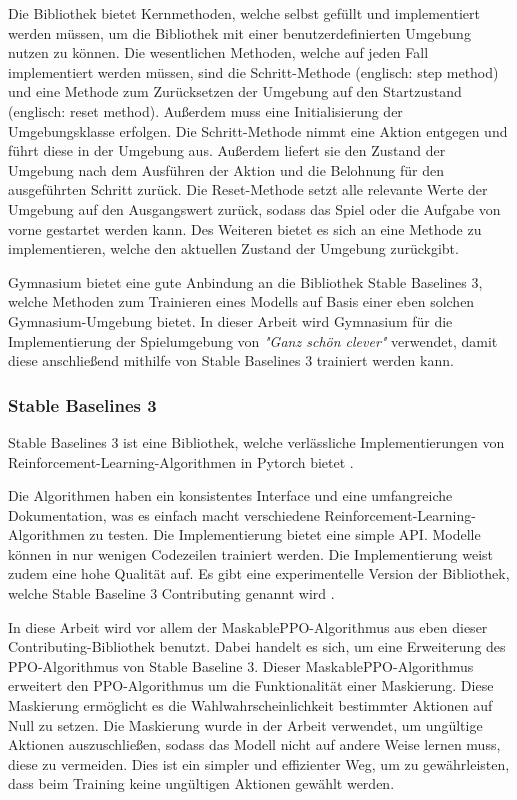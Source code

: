 Die Bibliothek bietet Kernmethoden, welche selbst gefüllt und implementiert werden müssen, um die Bibliothek mit einer benutzerdefinierten Umgebung nutzen zu können. Die wesentlichen Methoden, welche auf jeden Fall implementiert werden müssen, sind die Schritt-Methode (englisch: step method) und eine Methode zum Zurücksetzen der Umgebung auf den Startzustand (englisch: reset method). Außerdem muss eine Initialisierung der Umgebungsklasse erfolgen. Die Schritt-Methode nimmt eine Aktion entgegen und führt diese in der Umgebung aus. Außerdem liefert sie den Zustand der Umgebung nach dem Ausführen der Aktion und die Belohnung für den ausgeführten Schritt zurück. Die Reset-Methode setzt alle relevante Werte der Umgebung auf den Ausgangswert zurück, sodass das Spiel oder die Aufgabe von vorne gestartet werden kann. Des Weiteren bietet es sich an eine Methode zu implementieren, welche den aktuellen Zustand der Umgebung zurückgibt.

Gymnasium bietet eine gute Anbindung an die Bibliothek Stable Baselines 3, welche Methoden zum Trainieren eines Modells auf Basis einer eben solchen Gymnasium-Umgebung bietet. In dieser Arbeit wird Gymnasium für die Implementierung der Spielumgebung von \textit{"Ganz schön clever"} verwendet, damit diese anschließend mithilfe von Stable Baselines 3 trainiert werden kann.
\subsubsection{Stable Baselines 3}
Stable Baselines 3 ist eine Bibliothek, welche verlässliche Implementierungen von Reinforcement-Learning-Algorithmen in Pytorch bietet \cite[S. 1]{noauthor_stable-baselines3_nodate}. 

Die Algorithmen haben ein konsistentes Interface und eine umfangreiche Dokumentation, was es einfach macht verschiedene Reinforcement-Learning-Algorithmen zu testen. Die Implementierung bietet eine simple API. Modelle können in nur wenigen Codezeilen trainiert werden. Die Implementierung weist zudem eine hohe Qualität auf. Es gibt eine experimentelle Version der Bibliothek, welche Stable Baseline 3 Contributing genannt wird \cite[S. 1-3]{noauthor_stable-baselines3_nodate}.

In diese Arbeit wird vor allem der MaskablePPO-Algorithmus aus eben dieser Contributing-Bibliothek benutzt. Dabei handelt es sich, um eine Erweiterung des PPO-Algorithmus von Stable Baseline 3. Dieser MaskablePPO-Algorithmus erweitert den PPO-Algorithmus um die Funktionalität einer Maskierung. Diese Maskierung ermöglicht es die Wahlwahrscheinlichkeit bestimmter Aktionen auf Null zu setzen. Die Maskierung wurde in der Arbeit verwendet, um ungültige Aktionen auszuschließen, sodass das Modell nicht auf andere Weise lernen muss, diese zu vermeiden. Dies ist ein simpler und effizienter Weg, um zu gewährleisten, dass beim Training keine ungültigen Aktionen gewählt werden.
